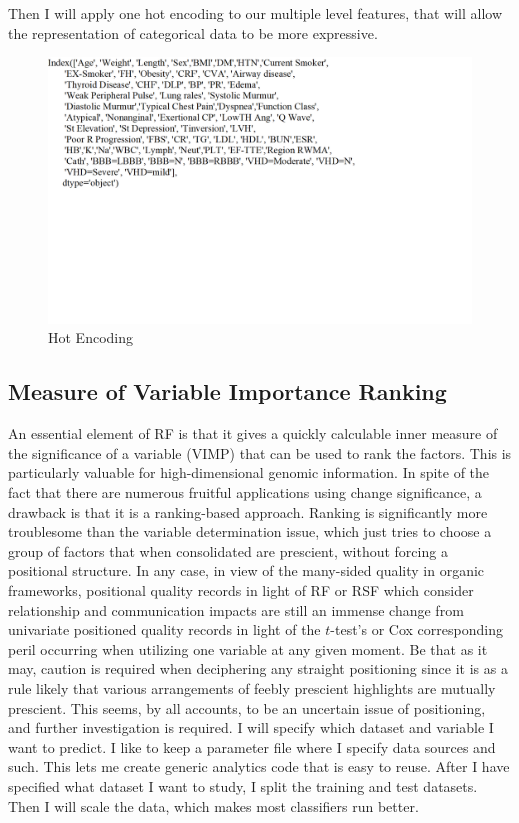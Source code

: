 \documentclass[sigconf]{acmart}
\begin{document}
Then I will apply one hot encoding to our multiple level features, that will allow the representation of categorical data to be more expressive.

\begin{figure}
    \centering
    \includegraphics[width=1.0\columnwidth]{project/images/Encoding.png}
    \caption{Hot Encoding}
    \label{Hot Enco}
\end{figure}
    
\subsection{Measure of Variable Importance Ranking}
An essential element of RF is that it gives a quickly calculable inner measure of the significance of a variable (VIMP) that can be used to rank the factors.
This is particularly valuable for high-dimensional genomic information.  In spite of the fact that there are numerous fruitful applications using change significance, a drawback is that it is a ranking-based approach.
Ranking is significantly more troublesome than the variable determination issue, which just tries to choose a group of factors that when consolidated are prescient, without forcing a positional structure.
In any case, in view of the many-sided quality in organic frameworks, positional quality records in light of RF or RSF which consider relationship and communication impacts are still an immense change from univariate positioned quality records in light of the $t$-test's or Cox corresponding peril occurring when  utilizing one variable at any given moment.
Be that as it may, caution is required when deciphering any straight positioning since it is as a rule likely that various arrangements of feebly prescient highlights are mutually prescient.
This seems, by all accounts, to be an uncertain issue of positioning, and further investigation is required.
I will specify which dataset and variable I want to predict.  I like to keep a parameter file where I specify data sources and such.
This lets me create generic analytics code that is easy to reuse.
After I have specified what dataset I want to study, I split the training and test datasets.
Then I will scale the data, which makes most classifiers run better.
\end{document}
